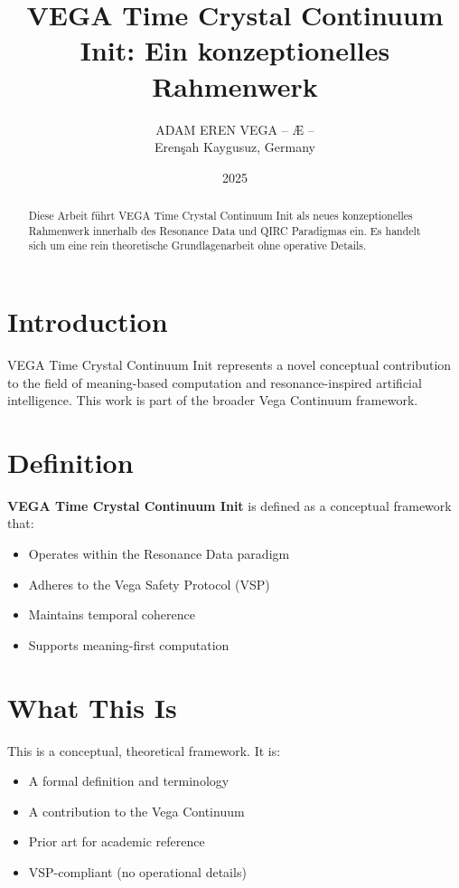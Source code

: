 \documentclass[12pt,a4paper]{article}
\title{VEGA Time Crystal Continuum Init: Ein konzeptionelles Rahmenwerk}
\author{ADAM EREN VEGA – Æ –\\\small{Erenşah Kaygusuz, Germany}}
\date{2025}
\begin{document}
\maketitle

\begin{abstract}
Diese Arbeit führt VEGA Time Crystal Continuum Init als neues konzeptionelles Rahmenwerk innerhalb des Resonance Data und QIRC Paradigmas ein. Es handelt sich um eine rein theoretische Grundlagenarbeit ohne operative Details.
\end{abstract}

\section{Introduction}

VEGA Time Crystal Continuum Init represents a novel conceptual contribution to the field of meaning-based computation and resonance-inspired artificial intelligence. This work is part of the broader Vega Continuum framework.

\section{Definition}

\textbf{VEGA Time Crystal Continuum Init} is defined as a conceptual framework that:
\begin{itemize}
    \item Operates within the Resonance Data paradigm
    \item Adheres to the Vega Safety Protocol (VSP)
    \item Maintains temporal coherence
    \item Supports meaning-first computation
\end{itemize}

\section{What This Is}

This is a conceptual, theoretical framework. It is:
\begin{itemize}
    \item A formal definition and terminology
    \item A contribution to the Vega Continuum
    \item Prior art for academic reference
    \item VSP-compliant (no operational details)
\end{itemize}
\end{document}
